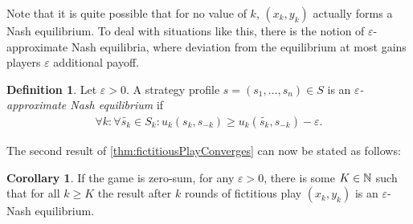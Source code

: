 \documentclass[a4paper]{scrreprt}
\let\epsilon\varepsilon
\theoremstyle{definition}
\newtheorem{cor}[thm]{Corollary}
\newtheorem{defn}[thm]{Definition} %
\begin{document}
    Note that it is quite possible that for no value of $k$, $(x_k, y_k)$ actually forms a Nash equilibrium.
    To deal with situations like this, there is the notion of $\epsilon$-approximate Nash equilibria, where deviation from the equilibrium at most gains players $\epsilon$ additional payoff.
        
    \begin{defn}
        Let $\epsilon > 0$.
        A strategy profile $s = (s_1, \dots, s_n) \in S$ is an \emph{$\epsilon$-approximate Nash equilibrium} if
        \begin{gather*} 
            \forall k: \forall \tilde{s_k} \in S_k: u_k(s_k, s_{-k}) \geq u_k(\tilde{s_k}, s_{-k}) - \epsilon.
        \end{gather*} 
    \end{defn}

    The second result of \ref{thm:fictitiousPlayConverges} can now be stated as follows:
    \begin{cor}
        If the game is zero-sum, for any $\epsilon > 0$, there is some $K \in \mathbb{N}$ such that for all $k \geq K$ the result after $k$ rounds of fictitious play $(x_k, y_k)$ is an $\epsilon$-Nash equilibrium.
    \end{cor}

    
    
    
    
    
    
\end{document}
